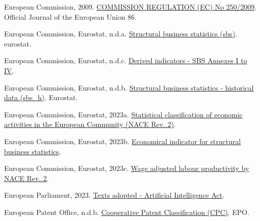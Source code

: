 \documentclass[
  12pt,
  a4paperpaper,
]{article}
\newlength{\cslhangindent}
\newenvironment{CSLReferences}[2] %
 {\begin{list}{}{%
  \setlength{\itemindent}{0pt}
  \setlength{\leftmargin}{0pt}
  \setlength{\parsep}{0pt}
  \ifodd #1
   \setlength{\leftmargin}{\cslhangindent}
   \setlength{\itemindent}{-1\cslhangindent}
  \fi
  \setlength{\itemsep}{#2\baselineskip}}}
 {\end{list}}
\begin{document}
\begin{CSLReferences}{1}{0}
European Commission, 2009.
\href{https://eur-lex.europa.eu/LexUriServ/LexUriServ.do?uri=OJ:L:2009:086:0001:0169:EN:PDF}{{COMMISSION}
{REGULATION} ({EC}) {No} 250/2009}. Official Journal of the European
Union 86.

European Commission, Eurostat, n.d.a.
\href{https://ec.europa.eu/eurostat/cache/metadata/en/sbs_esms.htm\#ref_period1696509477074}{Structural
business statistics (sbs)}. eurostat.

European Commission, Eurostat, n.d.c.
\href{https://circabc.europa.eu/sd/a/1e89d16d-e6dc-4686-8709-55cde25c06c0/Derived\%20indicators.pdf}{Derived
indicators - {SBS} {Annexes} {I} to {IV}}.

European Commission, Eurostat, n.d.b.
\href{https://ec.europa.eu/eurostat/cache/metadata/en/sbs_h_esms.htm}{Structural
business statistics - historical data (sbs\_h)}. Eurostat.

European Commission, Eurostat, 2023a.
\href{https://ec.europa.eu/eurostat/api/dissemination/sdmx/2.1/codelist/ESTAT/NACE_R2/?compressed=true&format=TSV&lang=en}{Statistical
classification of economic activities in the {European} {Community}
({NACE} {Rev}. 2)}.

European Commission, Eurostat, 2023b.
\href{https://ec.europa.eu/eurostat/api/dissemination/sdmx/2.1/codelist/ESTAT/INDIC_SB/?compressed=true&format=TSV&lang=en}{Economical
indicator for structural business statistics}.

European Commission, Eurostat, 2023c.
\href{https://data.europa.eu/data/datasets/28me30qlxbdlq7nbmc4ow?locale=en}{Wage
adjusted labour productivity by {NACE} {Rev}. 2}.

European Parliament, 2023.
\href{https://www.europarl.europa.eu/doceo/document/TA-9-2023-0236_EN.pdf}{Texts
adopted - {Artificial} {Intelligence} {Act}}.

European Patent Office, n.d.b.
\href{https://www.epo.org/en/searching-for-patents/helpful-resources/first-time-here/classification/cpc}{Cooperative
{Patent} {Classification} ({CPC})}. EPO.


\end{CSLReferences}
\end{document}
